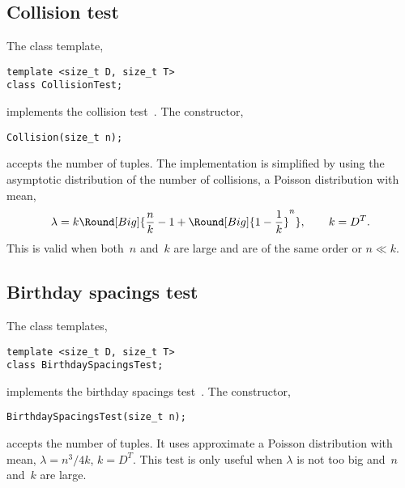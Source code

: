 \subsection{Collision test}
\label{Collision test}

The class template,
\begin{verbatim}
template <size_t D, size_t T>
class CollisionTest;
\end{verbatim}
implements the collision test~\cite[pp.~70]{Knuth:1997us}. The constructor,
\begin{verbatim}
Collision(size_t n);
\end{verbatim}
accepts the number of tuples. The implementation is simplified by using the
asymptotic distribution of the number of collisions, a Poisson distribution
with mean,
\begin{equation*}
  \lambda = k\Round[Big]{
    \frac{n}{k} - 1 + \Round[Big]{1 - \frac{1}{k}}^n},\qquad k = D^T.
\end{equation*}
This is valid when both~$n$ and~$k$ are large and are of the same order or
$n \ll k$.

\subsection{Birthday spacings test}
\label{sub:Birthday spacings test}

The class templates,
\begin{verbatim}
template <size_t D, size_t T>
class BirthdaySpacingsTest;
\end{verbatim}
implements the birthday spacings test~\cite[pp.~71]{Knuth:1997us}. The
constructor,
\begin{verbatim}
BirthdaySpacingsTest(size_t n);
\end{verbatim}
accepts the number of tuples. It uses approximate a Poisson distribution with
mean, $\lambda = n^3/4k$, $k = D^T$. This test is only useful when $\lambda$ is
not too big and~$n$ and~$k$ are large.
